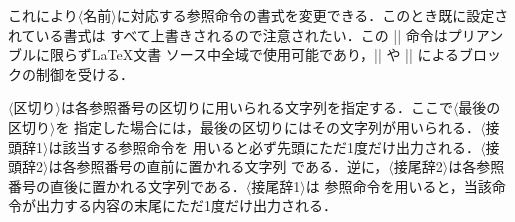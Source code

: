 \documentclass[a4paper,uplatex]{jsarticle}
\newcommand{\Meta}[1]{$\langle$\mbox{}#1\mbox{}$\rangle$}
\begin{document}
これにより\Meta{名前}に対応する参照命令の書式を変更できる．このとき既に設定されている書式は
すべて上書きされるので注意されたい．この |\setrefstyle| 命令はプリアンブルに限らず\LaTeX 文書
ソース中全域で使用可能であり，|{| や |}| によるブロックの制御を受ける．

\Meta{区切り}は各参照番号の区切りに用いられる文字列を指定する．ここで\Meta{最後の区切り}を
指定した場合には，最後の区切りにはその文字列が用いられる．\Meta{接頭辞1}は該当する参照命令を
用いると必ず先頭にただ1度だけ出力される．\Meta{接頭辞2}は各参照番号の直前に置かれる文字列
である．逆に，\Meta{接尾辞2}は各参照番号の直後に置かれる文字列である．\Meta{接尾辞1}は
参照命令を用いると，当該命令が出力する内容の末尾にただ1度だけ出力される．
\end{document}

